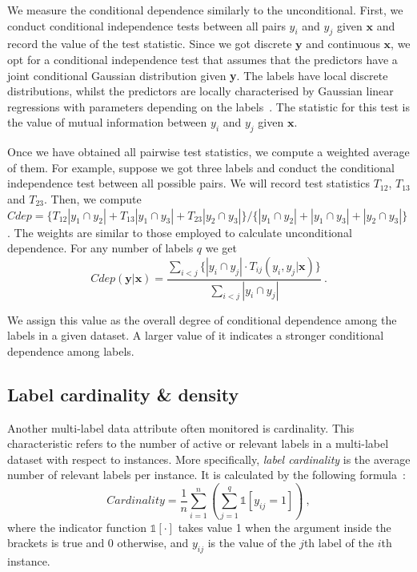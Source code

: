 \documentclass[review]{elsarticle}
\begin{document}
We measure the conditional dependence similarly to the unconditional. First, we conduct conditional independence tests between all pairs ${y}_{i}$ and ${y}_{j}$ given $\mathbf{x}$ and record the value of the test statistic. Since we got discrete $\mathbf{y}$ and continuous $\mathbf{x}$, we opt for a conditional independence test that assumes that the predictors have a joint conditional Gaussian distribution given \textbf{y}. The labels have local discrete distributions, whilst the predictors are locally characterised by Gaussian linear regressions with parameters depending on the labels~\citep{CGD}. The statistic for this test is the value of mutual information between ${y}_{i}$ and ${y}_{j}$ given $\mathbf{x}$.

Once we have obtained all pairwise test statistics, we compute a weighted average of them. For example, suppose we got three labels and conduct the conditional independence test between all possible pairs. We will record test statistics $T_{12}$, $T_{13}$ and $T_{23}$. Then, we compute $Cdep = \{T_{12}| {y}_{1} \cap {y}_{2} | + T_{13}| {y}_{1} \cap {y}_{3} | + T_{23}| {y}_{2} \cap {y}_{3} | \} / \{| {y}_{1} \cap {y}_{2} | + | {y}_{1} \cap {y}_{3} | + | {y}_{2} \cap {y}_{3} |\}$. The weights are similar to those employed to calculate unconditional dependence. For any number of labels $q$ we get
\begin{equation}
Cdep(\mathbf{y}|\mathbf{x}) = \frac{\sum_{i < j}\{| {y}_{i} \cap {y}_{j} | \cdot T_{ij}\left({y}_{i},{y}_{j} |\mathbf{x}\right)\}}{\sum_{i < j}{| {y}_{i} \cap {y}_{j} |}}\ .
\end{equation}

We assign this value as the overall degree of conditional dependence among the labels in a given dataset. A larger value of it indicates a stronger conditional dependence among labels.

\subsection{Label cardinality \& density}

Another multi-label data attribute often monitored is cardinality. This  characteristic refers to the number of active or relevant labels in a multi-label dataset with respect to instances. More specifically, \emph{label cardinality} is the average number of relevant labels per instance. It is calculated by the following formula~\citep{Tsoumakas:07,Gibaja:15}:
\begin{equation}
Cardinality = \frac{1}{n} \sum^{n}_{i=1}{\left(\sum^{q}_{j=1}{\mathds{1}\left[y_{ij} = 1 \right]}\right)}\ ,
\end{equation}
where the indicator function $\mathds{1}[\cdot]$ takes value 1 when the argument inside the brackets is true and 0 otherwise, and $y_{ij}$ is the value of the $j$th label of the $i$th instance.
\end{document}
